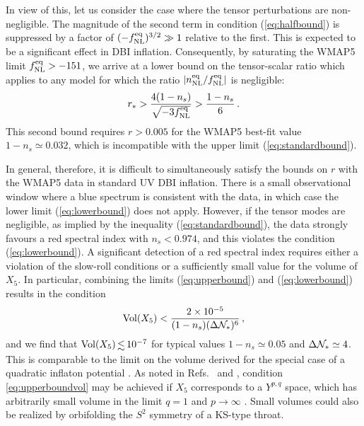 In view of this, let us consider the case where the tensor 
perturbations are non-negligible. 
The magnitude of the second term in condition (\ref{eq:halfbound}) 
is suppressed by a factor of $(-f_{\mathrm{NL}}^{\mathrm{eq}})^{3/2} \gg 1$ 
relative to the first. This is expected to 
be a significant effect in DBI inflation. 
Consequently, 
by saturating the WMAP5 limit $f_{\mathrm{NL}}^{\mathrm{eq}} > -151$, we arrive at 
a lower bound on the tensor-scalar ratio which applies   
to any model for which the ratio $|n_{\mathrm{NL}}^{\mathrm{eq}}/f_{\mathrm{NL}}^{\mathrm{eq}}|$ is 
negligible:
% 
\begin{equation}
\label{eq:lowerbound}
r_* >  \frac{4(1-n_s)}{\sqrt{-3f_{\mathrm{NL}}^{\mathrm{eq}}}} > \frac{1-n_s}{6} \,.
\end{equation}
% 
This second bound requires $r > 0.005$ for the WMAP5 best-fit value 
$1-n_s \simeq 0.032$, which is incompatible with the upper limit 
(\ref{eq:standardbound}). 


In general, therefore, it is difficult to simultaneously satisfy 
the bounds on $r$ with the WMAP5 data
in standard UV DBI inflation. There is a 
small observational window where a blue spectrum is consistent 
with the data, in which case the lower limit 
(\ref{eq:lowerbound}) does not apply. 
However, if the tensor modes are negligible,
as implied by the inequality (\ref{eq:standardbound}), the 
data strongly favours a red spectral index with $n_s < 0.974$,
and this violates the condition (\ref{eq:lowerbound}). A significant 
detection of a red spectral index requires either a 
violation of the slow-roll conditions or a sufficiently 
small value for the volume of $X_5$. 
In particular, combining the limits
(\ref{eq:upperbound}) and (\ref{eq:lowerbound}) results in the condition 
% 
\begin{equation}
\label{eq:upperboundvol}
\mathrm{Vol}(X_5) < \frac{2 \times 10^{-5}}{(1-n_s) 
(\Delta \mathcal{N}_{*} )^6}  \,,
\end{equation}
% 
and we find that $\mathrm{Vol}(X_5) \, \lsim \, 10^{-7}$ 
for typical values $1-n_s \simeq 0.05$ and 
$\Delta \mathcal{N}_* \simeq 4$. 
This 
is comparable to the limit on the volume derived for the special case of a 
quadratic inflaton potential \cite{bmpaper}.  
As noted in Refs.~\cite{bmpaper} and \cite{bean}, condition 
\eqref{eq:upperboundvol} may be achieved 
if $X_5$ corresponds to a $Y^{p,q}$ space, 
which has arbitrarily small volume in the limit  
$q =1$ and $p \rightarrow \infty$ \cite{gauntlett}. 
Small volumes could also be realized 
by orbifolding the $S^2$ symmetry of a KS-type throat. 


